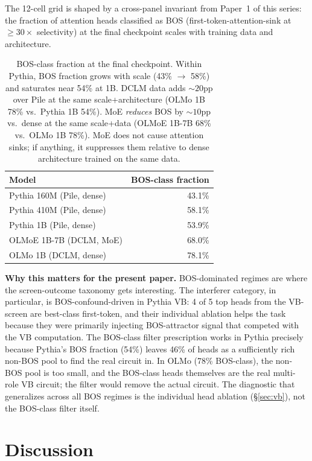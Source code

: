 \documentclass[11pt]{article}
\begin{document}
The 12-cell grid is shaped by a cross-panel invariant from Paper~1 of this series: the fraction of attention heads classified as BOS (first-token-attention-sink at $\geq 30\times$ selectivity) at the final checkpoint scales with training data and architecture.

\begin{table}[h]
\centering
\small
\begin{tabular}{lr}
\toprule
Model & BOS-class fraction \\
\midrule
Pythia 160M (Pile, dense) & 43.1\% \\
Pythia 410M (Pile, dense) & 58.1\% \\
Pythia 1B (Pile, dense) & 53.9\% \\
OLMoE 1B-7B (DCLM, MoE) & 68.0\% \\
OLMo 1B (DCLM, dense) & 78.1\% \\
\bottomrule
\end{tabular}
\caption{BOS-class fraction at the final checkpoint. Within Pythia, BOS fraction grows with scale (43\% $\to$ 58\%) and saturates near 54\% at 1B. DCLM data adds $\sim 20$pp over Pile at the same scale+architecture (OLMo 1B 78\% vs.\ Pythia 1B 54\%). MoE \emph{reduces} BOS by $\sim 10$pp vs.\ dense at the same scale+data (OLMoE 1B-7B 68\% vs.\ OLMo 1B 78\%). MoE does not cause attention sinks; if anything, it suppresses them relative to dense architecture trained on the same data.}
\label{tab:bos-frac}
\end{table}

\textbf{Why this matters for the present paper.} BOS-dominated regimes are where the screen-outcome taxonomy gets interesting. The interferer category, in particular, is BOS-confound-driven in Pythia VB: 4 of 5 top heads from the VB-screen are best-class first-token, and their individual ablation helps the task because they were primarily injecting BOS-attractor signal that competed with the VB computation. The BOS-class filter prescription works in Pythia precisely because Pythia's BOS fraction (54\%) leaves 46\% of heads as a sufficiently rich non-BOS pool to find the real circuit in. In OLMo (78\% BOS-class), the non-BOS pool is too small, and the BOS-class heads themselves are the real multi-role VB circuit; the filter would remove the actual circuit. The diagnostic that generalizes across all BOS regimes is the individual head ablation (\S\ref{sec:vb}), not the BOS-class filter itself.

\section{Discussion}
\label{sec:discussion}
\end{document}
